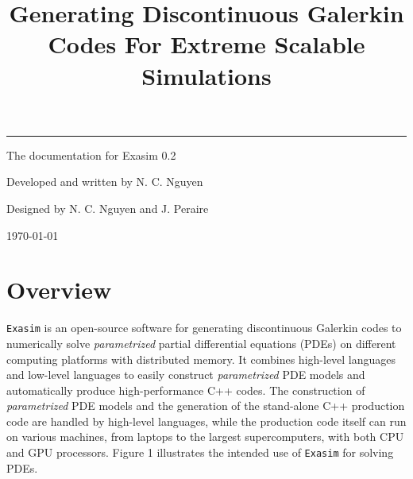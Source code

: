 \documentclass[11pt]{article}
\date{}
\begin{document}
    
        \title{\huge Generating Discontinuous Galerkin Codes For Extreme Scalable Simulations}
        
    \maketitle

 \rule{16.4cm}{0.25cm} 

\hspace{8cm} {\large The documentation for Exasim 0.2}

\hspace{8cm}    {\large Developed and written by N. C. Nguyen}

\hspace{8cm}   {\large Designed by N. C. Nguyen and J. Peraire}
        
\hspace{8cm} {\large \today}
    
\vspace{6cm}

    
    \newpage
    
\section{Overview}

\texttt{Exasim} is an open-source software for generating discontinuous Galerkin codes to numerically solve {\em parametrized} partial differential equations (PDEs) on different computing platforms with distributed memory.  It combines high-level languages  and low-level languages to easily construct {\em parametrized} PDE models and automatically produce high-performance C++ codes. The construction of {\em parametrized} PDE models and the generation of the stand-alone C++ production code are handled by high-level languages, while the production code itself can run on various machines, from laptops to the largest supercomputers, with both CPU and GPU processors. Figure 1 illustrates  the intended use of \texttt{Exasim} for solving PDEs.

\end{document}
